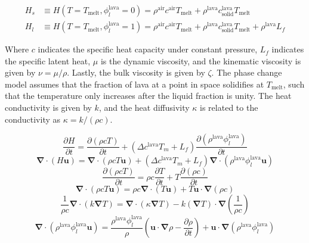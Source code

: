 \begin{equation}
\begin{split}
    H_s &\equiv H(T = T_{\text{melt}}, \phi_l^{\text{lava}} = 0) = \rho^{\text{air}} c^{\text{air}} T_{\text{melt}} + \rho^{\text{lava}} c^{\text{lava}}_{\text{solid}} T_{\text{melt}}\\
    H_l &\equiv H(T = T_{\text{melt}}, \phi_l^{\text{lava}} = 1) = \rho^{\text{air}} c^{\text{air}} T_{\text{melt}} + \rho^{\text{lava}} c^{\text{lava}}_{\text{solid}} T_{\text{melt}} + \rho^{\text{lava}}L_f
\end{split}
\end{equation}

Where $c$ indicates the specific heat capacity under constant pressure, $L_f$ indicates the specific latent heat, $\mu$ is the dynamic viscosity, and the kinematic viscosity is given by $\nu = \mu / \rho$. Lastly, the bulk viscosity is given by $\zeta$. The phase change model assumes that the fraction of lava at a point in space solidifies at $T_{\text{melt}}$, such that the temperature only increases after the liquid fraction is unity. The heat conductivity is given by $k$, and the heat diffusivity $\kappa$ is related to the conductivity as $\kappa = k / \left(\rho c\right)$.

\begin{equation}
    \frac{\partial H}{\partial t} = \frac{\partial\left(\rho c T\right)}{\partial t} + \left(\Delta c^{\text{lava}} T_m + L_f\right) \frac{\partial \left(\rho^{\text{lava}}\phi_l^{\text{lava}}\right)}{\partial t}
\end{equation}
\begin{equation}
    \bm{\nabla} \cdot \left(H \bm{u}\right) = \bm{\nabla}\cdot\left(\rho c T \bm{u}\right) + \left(\Delta c^{\text{lava}} T_m + L_f\right) \bm{\nabla}\cdot\left(\rho^{\text{lava}}\phi_l^{\text{lava}} \bm{u}\right)
\end{equation}
\begin{equation}
    \frac{\partial\left(\rho c T\right)}{\partial t} = \rho c \frac{\partial T}{\partial t} + T \frac{\partial\left(\rho c\right)}{\partial t}
\end{equation}
\begin{equation}
    \bm{\nabla}\cdot\left(\rho c T \bm{u}\right) = \rho c \bm{\nabla}\cdot\left(T \bm{u}\right) + T \bm{u}\cdot\bm{\nabla}\left(\rho c\right)
\end{equation}
\begin{equation}
    \frac{1}{\rho c}\bm{\nabla}\cdot\left(k \bm{\nabla}T\right) = \bm{\nabla}\cdot\left(\kappa \bm{\nabla}T\right) - k \left(\bm{\nabla}T\right) \cdot\bm{\nabla}\left(\frac{1}{\rho c}\right)
\end{equation}
\begin{equation}
    \bm{\nabla}\cdot\left(\rho^{\text{lava}}\phi_l^{\text{lava}} \bm{u}\right) = \frac{\rho^{\text{lava}}\phi_l^{\text{lava}}}{\rho}\left(\bm{u}\cdot \bm{\nabla}\rho - \frac{\partial \rho}{\partial t}\right) + \bm{u}\cdot\bm{\nabla}\left(\rho^{\text{lava}}\phi_l^{\text{lava}}\right)
\end{equation}

